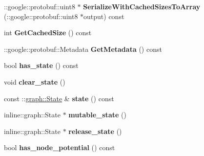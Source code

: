 \begin{DoxyCompactItemize}
\item 
\hypertarget{classgraph_1_1NodeStatePotential_a97a15dedabb827d070c9866eec649ca3}{
::google::protobuf::uint8 $\ast$ {\bfseries SerializeWithCachedSizesToArray} (::google::protobuf::uint8 $\ast$output) const }
\label{classgraph_1_1NodeStatePotential_a97a15dedabb827d070c9866eec649ca3}

\item 
\hypertarget{classgraph_1_1NodeStatePotential_aed31dd680aeefcc638f69aed20feaa89}{
int {\bfseries GetCachedSize} () const }
\label{classgraph_1_1NodeStatePotential_aed31dd680aeefcc638f69aed20feaa89}

\item 
\hypertarget{classgraph_1_1NodeStatePotential_a747619a9004ecad14ccf201304d2bca6}{
::google::protobuf::Metadata {\bfseries GetMetadata} () const }
\label{classgraph_1_1NodeStatePotential_a747619a9004ecad14ccf201304d2bca6}

\item 
\hypertarget{classgraph_1_1NodeStatePotential_a360c4a144fbf3d177d98617b5b680917}{
bool {\bfseries has\_\-state} () const }
\label{classgraph_1_1NodeStatePotential_a360c4a144fbf3d177d98617b5b680917}

\item 
\hypertarget{classgraph_1_1NodeStatePotential_aa742b7c0f5560b3ef8d9a611681cf73f}{
void {\bfseries clear\_\-state} ()}
\label{classgraph_1_1NodeStatePotential_aa742b7c0f5560b3ef8d9a611681cf73f}

\item 
\hypertarget{classgraph_1_1NodeStatePotential_ac914f8afa03faa9de6db823c5f21b7cc}{
const ::\hyperlink{classgraph_1_1State}{graph::State} \& {\bfseries state} () const }
\label{classgraph_1_1NodeStatePotential_ac914f8afa03faa9de6db823c5f21b7cc}

\item 
\hypertarget{classgraph_1_1NodeStatePotential_a8f877868f7590b5be5aae6a78279a75f}{
inline::graph::State $\ast$ {\bfseries mutable\_\-state} ()}
\label{classgraph_1_1NodeStatePotential_a8f877868f7590b5be5aae6a78279a75f}

\item 
\hypertarget{classgraph_1_1NodeStatePotential_a81e5e07ae88c654ef848a8ddfbec8148}{
inline::graph::State $\ast$ {\bfseries release\_\-state} ()}
\label{classgraph_1_1NodeStatePotential_a81e5e07ae88c654ef848a8ddfbec8148}

\item 
\hypertarget{classgraph_1_1NodeStatePotential_a2ef72c30a1c13aa21170eef7a43bde34}{
bool {\bfseries has\_\-node\_\-potential} () const }
\label{classgraph_1_1NodeStatePotential_a2ef72c30a1c13aa21170eef7a43bde34}


\end{DoxyCompactItemize}
